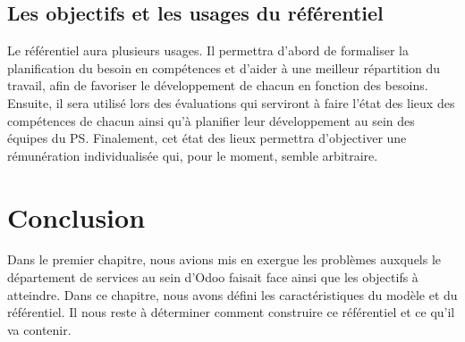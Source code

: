 \subsection{Les objectifs et les usages du référentiel}
Le référentiel aura plusieurs usages. Il permettra d'abord de formaliser la planification du besoin en compétences et d'aider à une meilleur répartition du travail, afin de favoriser le développement de chacun en fonction des besoins. Ensuite, il sera utilisé lors des évaluations qui serviront à faire l'état des lieux des compétences de chacun ainsi qu'à planifier leur développement au sein des équipes du PS. Finalement, cet état des lieux permettra d'objectiver une rémunération individualisée qui, pour le moment, semble arbitraire.



\section{Conclusion}
Dans le premier chapitre, nous avions mis en exergue les problèmes auxquels le département de services au sein d'Odoo faisait face ainsi que les objectifs à atteindre. Dans ce chapitre, nous avons défini les caractéristiques du modèle et du référentiel. Il nous reste à déterminer comment construire ce référentiel et ce qu'il va contenir.
 










 
